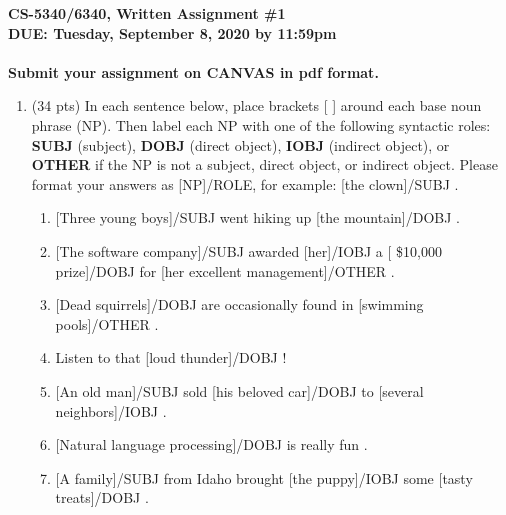 \documentclass[11pt]{article}
\begin{document}
\large
\begin{center}
{\bf CS-5340/6340, Written Assignment \#1} \\
{\bf DUE: Tuesday, September 8, 2020 by 11:59pm} \\ ~ \\
{\bf  Submit your assignment on CANVAS in pdf format.}
\end{center}
\normalsize

\begin{enumerate}  


\item (34 pts) In each sentence below, place brackets [ ] around each base
  noun phrase (NP). Then label each NP with one of the following
  syntactic roles: {\bf SUBJ} (subject), {\bf DOBJ} (direct object),
  {\bf IOBJ} (indirect object), or {\bf OTHER} if the NP is not a
  subject, direct object, or indirect object. Please format your
  answers as [NP]/ROLE, for example: [the clown]/SUBJ .

  \begin{enumerate}

  \item {[Three young boys]}/SUBJ went hiking up {[the mountain]}/DOBJ . 

  \item {[The software company]}/SUBJ awarded {[her]}/IOBJ a {[ \$10,000 prize]}/DOBJ for {[her excellent management]}/OTHER .  


  \item {[Dead squirrels]}/DOBJ are occasionally found in {[swimming pools]}/OTHER .

  \item Listen to that {[loud thunder]}/DOBJ !
    
 \item {[An old man]}/SUBJ sold {[his beloved car]}/DOBJ to {[several neighbors]}/IOBJ . 

  \item {[Natural language processing]}/DOBJ is really fun .

  \item {[A family]}/SUBJ from Idaho brought {[the puppy]}/IOBJ some {[tasty treats]}/DOBJ . 
    
  \end{enumerate}


\newpage


\end{enumerate}
\end{document}
